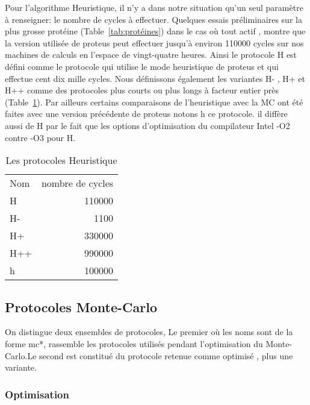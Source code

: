 Pour l'algorithme Heuristique, il n'y a dans notre situation qu'un seul paramètre à renseigner: le nombre de cycles à effectuer. Quelques essais préliminaires sur la plus grosse protéine (Table~\ref{tab:protéines}) dans le cas où tout actif , montre que la version utilisée de proteus peut effectuer jusqu'à environ 110000 cycles sur nos machines de calculs en l'espace de vingt-quatre heures. Ainsi le protocole H est défini comme le protocole qui utilise le mode heuristique de proteus et qui effectue cent dix mille cycles. Nous définissons également les variantes H- , H+ et H++ comme des protocoles plus courts ou plus longs à facteur entier près (Table~\ref{tab:protoH}). Par ailleurs certains comparaisons de l'heuristique avec la MC ont été faites avec une version précédente de proteus notons h ce protocole. il diffère  aussi de H par le fait que les options d'optimisation du compilateur Intel -O2 contre -O3 pour H.    


    \begin{table}[!htbp]
      \centering

      \begin{tabular}{lr}

        \toprule
        Nom & nombre de cycles \\
        \cmidrule{1-2}
        H   & 110000 \\  
        H-  & 1100   \\  
        H+  & 330000 \\  
        H++ & 990000 \\  
        h   & 100000 \\  
        \bottomrule

      \end{tabular}      
      \caption{Les protocoles Heuristique}
\label{tab:protoH}      
    \end{table}

   \subsection{Protocoles Monte-Carlo}
\label{sec:MC}
On distingue deux ensembles de protocoles, Le premier où les noms  sont de la forme mc*, rassemble les protocoles utilisés pendant l'optimisation du Monte-Carlo.Le second est constitué du protocole retenue comme optimisé , plus une variante.     

\subsubsection{Optimisation}

